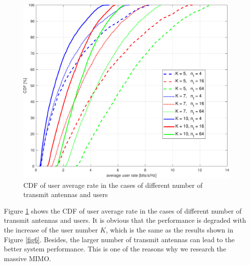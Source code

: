 \documentclass[10pt,conference]{IEEEtran}
\begin{document}
\begin{figure} [htb]
    \centering
    \includegraphics[width=1\linewidth]{Fig10.pdf}
    \caption{CDF of user average rate in the cases of different number of transmit antennas and users}
    \label{fig7.5}
\end{figure}

Figure \ref{fig7.5} shows the CDF of user average rate in the cases of different number of 
transmit antennas and users. It is obvious that the performance is degraded with the increase of the 
user number $K$, which is the same as the results shown in Figure \ref{fig6}.
Besides, the larger number of transmit antennas can lead to the better system performance. 
This is one of the reasons why we research the massive MIMO. 
\end{document}
